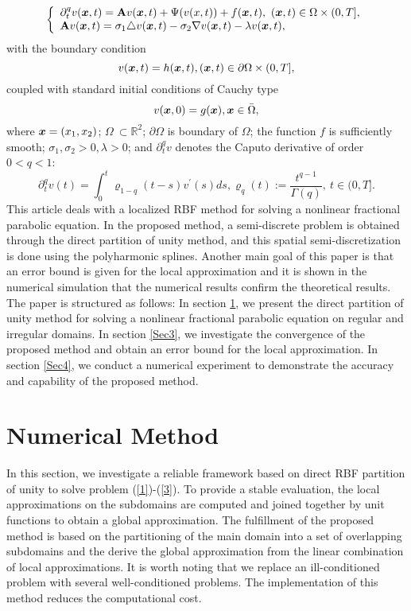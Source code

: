\documentclass[9pt]{article}
\numberwithin{equation}{section}
\def\bfm#1{\protect{\makebox{\boldmath $#1$}}}
\def\x {\bfm{x}}
\begin{document}
\begin{equation}\label{1}
\left\{
  \begin{array}{ll}
  \partial^{q}_{t}v(\x,t)=\mathbf{A}v(\x,t)+\Psi(v(x,t))+f(\x,t),~  (\x,t)\in \Omega \times(0,T]  ,\\
    \mathbf{A}v(\x,t)=\sigma_1\triangle v(\x,t)-\sigma_2 \nabla v(\x,t)-\lambda v(\x,t),
  \end{array}
\right.
	\end{equation}
with the boundary condition
	\begin{equation}\label{2}
v(\x,t)=h(\x,t) , (\x,t)\in \partial \Omega \times(0,T],
		\end{equation}
coupled with standard initial conditions of Cauchy type
\begin{equation}\label{3}
   v(\x,0)=g(\x),\x \in \bar{\Omega},
		\end{equation}
where $\x=(x_{1},x_{2})$; $\Omega~\subset \mathbb{R}^2$;  $\partial \Omega$ is boundary of $\Omega$; the function
$f$ is sufficiently smooth; $\sigma_1,\sigma_2>0,\lambda>0$; and $\partial^{q }_{t}v$ denotes the Caputo derivative
of order $0<q<1$:
 \[  \partial^{q }_{t}v(t)=\int_0^{t}\varrho_{1-q }(t-s)v^{'}(s)ds,\varrho_{q }(t):=\dfrac{t^{q  -1}}{ \Gamma (q )} ,~ t \in (0,T]. \]
This article deals with a localized RBF method for solving a nonlinear fractional parabolic equation. In the proposed method, a semi-discrete problem is obtained through the direct partition of unity method, and this spatial semi-discretization is done using the polyharmonic splines. Another main goal of this paper is that an error bound is given for the local approximation and it is shown in the numerical simulation that the numerical results confirm the theoretical results.\\
The paper is structured as follows: In section \ref{Sec2}, we present the direct partition of unity method for solving a nonlinear fractional parabolic equation on regular and irregular domains. In section \ref{Sec3}, we investigate the convergence of the proposed method and obtain an error bound for the local approximation. In section \ref{Sec4}, we conduct a numerical experiment to demonstrate the accuracy and capability of the proposed method. 
\section{Numerical Method}\label{Sec2}
In this section, we investigate a reliable framework based on direct RBF partition of unity to solve problem (\ref{1})-(\ref{3}).  To provide a stable evaluation, the local approximations on the subdomains are computed and joined together by unit functions to obtain a global approximation. The fulfillment of the proposed method is based on the partitioning of the main domain into a set of overlapping subdomains and the derive the global approximation from the linear
combination of local approximations. It is worth
noting that we replace an ill-conditioned problem with several well-conditioned problems. The implementation of this method reduces the computational cost. 
\end{document}
